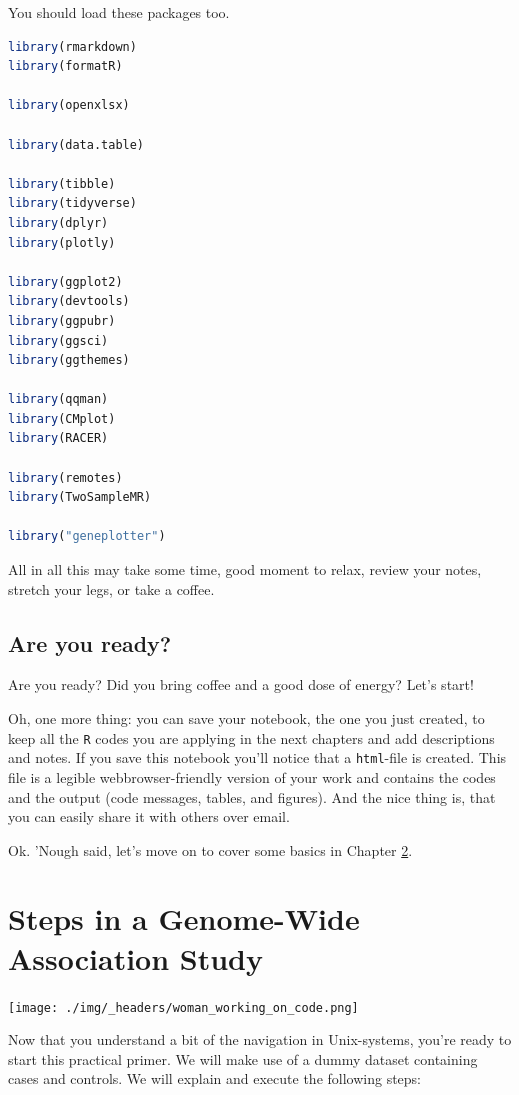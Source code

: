 \documentclass[
]{book}
\newcommand{\passthrough}[1]{#1}
\begin{document}
You should load these packages too.

\begin{lstlisting}[language=R]
library(rmarkdown)
library(formatR)

library(openxlsx)

library(data.table)

library(tibble)
library(tidyverse)
library(dplyr)
library(plotly)

library(ggplot2)
library(devtools)
library(ggpubr)
library(ggsci)
library(ggthemes)

library(qqman)
library(CMplot)
library(RACER)

library(remotes)
library(TwoSampleMR)

library("geneplotter")
\end{lstlisting}

All in all this may take some time, good moment to relax, review your notes, stretch your legs, or take a coffee.

\hypertarget{are-you-ready}{%
\section{Are you ready?}\label{are-you-ready}}

Are you ready? Did you bring coffee and a good dose of energy? Let's start!

Oh, one more thing: you can save your notebook, the one you just created, to keep all the \passthrough{\lstinline!R!} codes you are applying in the next chapters and add descriptions and notes. If you save this notebook you'll notice that a \passthrough{\lstinline!html!}-file is created. This file is a legible webbrowser-friendly version of your work and contains the codes and the output (code messages, tables, and figures). And the nice thing is, that you can easily share it with others over email.

Ok. 'Nough said, let's move on to cover some basics in Chapter \ref{gwas-basics}.

\hypertarget{gwas-basics}{%
\chapter{Steps in a Genome-Wide Association Study}\label{gwas-basics}}

\texttt{[image: ./img/\_headers/woman\_working\_on\_code.png]}

Now that you understand a bit of the navigation in Unix-systems, you're ready to start this practical primer. We will make use of a dummy dataset containing cases and controls. We will explain and execute the following steps:
\end{document}
